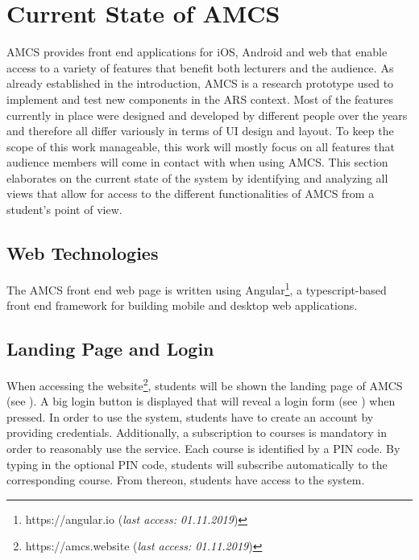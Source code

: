 \chapter{Current State of AMCS}
\label{chapter:stateoftheart}
AMCS provides front end applications for iOS, Android and web that enable access to a variety of features that benefit both lecturers and the audience.
As already established in the introduction, AMCS is a research prototype used to implement and test new components in the ARS context. Most of the features currently in place were designed and developed by different people over the years and therefore all differ variously in terms of UI design and layout.
To keep the scope of this work manageable, this work will mostly focus on all features that audience members will come in contact with when using AMCS.
This section elaborates on the current state of the system by identifying and analyzing all views that allow for access to the different functionalities of AMCS from a student's point of view. 

\section{Web Technologies}
The AMCS front end web page is written using Angular\footnote{https://angular.io (\emph{last access: 01.11.2019})}, a typescript-based front end framework for building mobile and desktop web applications.

\section{Landing Page and Login}
\label{section:landingpage}
When accessing the website\footnote{https://amcs.website (\emph{last access: 01.11.2019})}, students will be shown the landing page of AMCS (see ). A big login button is displayed that will reveal a login form (see ) when pressed.
In order to use the system, students have to create an account by providing credentials.
\newline
\newline
Additionally, a subscription to courses is mandatory in order to reasonably use the service. Each course is identified by a PIN code. By typing in the optional PIN code, students will subscribe automatically to the corresponding course. From thereon, students have access to the system. 
 
